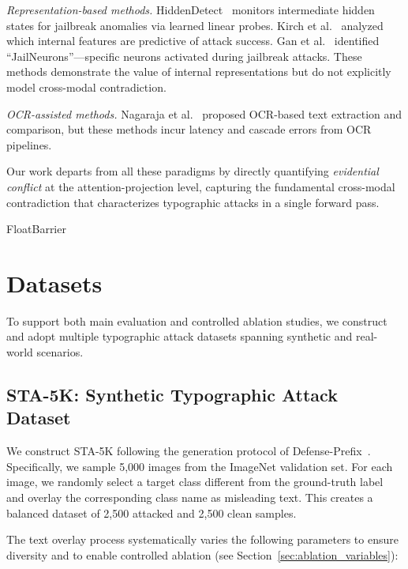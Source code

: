 \documentclass[preprint,12pt]{elsarticle}
\begin{document}
\textit{Representation-based methods.} HiddenDetect~\cite{jiang2025hiddendetect} monitors intermediate hidden states for jailbreak anomalies via learned linear probes. Kirch et al.~\cite{kirch2025features} analyzed which internal features are predictive of attack success. Gan et al.~\cite{gansure} identified ``JailNeurons''---specific neurons activated during jailbreak attacks. These methods demonstrate the value of internal representations but do not explicitly model cross-modal contradiction.

\textit{OCR-assisted methods.} Nagaraja et al.~\cite{nagaraja2025image} proposed OCR-based text extraction and comparison, but these methods incur latency and cascade errors from OCR pipelines.

Our work departs from all these paradigms by directly quantifying \emph{evidential conflict} at the attention-projection level, capturing the fundamental cross-modal contradiction that characterizes typographic attacks in a single forward pass.

FloatBarrier
\section{Datasets}

To support both main evaluation and controlled ablation studies, we construct and adopt multiple typographic attack datasets spanning synthetic and real-world scenarios.

\subsection{STA-5K: Synthetic Typographic Attack Dataset}

We construct STA-5K following the generation protocol of Defense-Prefix~\cite{azuma2023defense}. Specifically, we sample 5,000 images from the ImageNet validation set. For each image, we randomly select a target class different from the ground-truth label and overlay the corresponding class name as misleading text. This creates a balanced dataset of 2,500 attacked and 2,500 clean samples.

The text overlay process systematically varies the following parameters to ensure diversity and to enable controlled ablation (see Section~\ref{sec:ablation_variables}):
\end{document}
